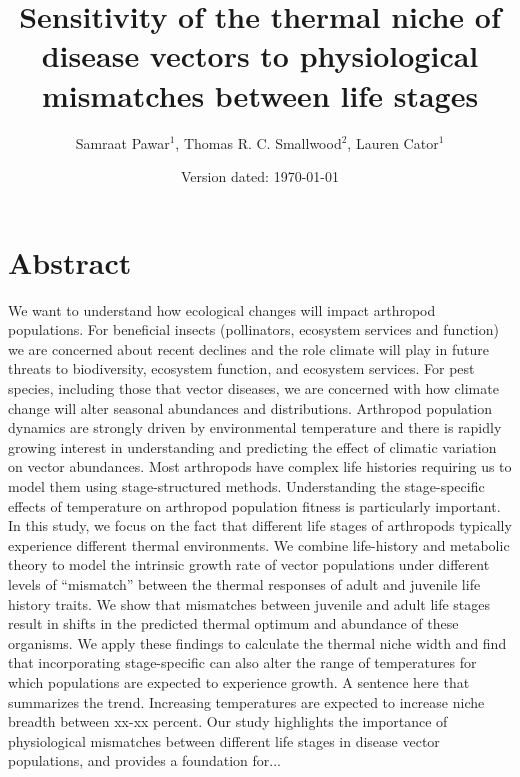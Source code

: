 

\title{Sensitivity of the thermal niche of disease vectors to physiological mismatches between life stages}

\author{Samraat Pawar$^1$, Thomas R. C. Smallwood$^2$, Lauren Cator$^1$}


\date{Version dated: \today}




\maketitle


\section*{Abstract}

We want to understand how ecological changes will impact arthropod populations. For beneficial insects (pollinators, ecosystem services and function) we are concerned about recent declines and the role climate will play in future threats to biodiversity, ecosystem function, and ecosystem services. For pest species, including those that vector diseases, we are concerned with how climate change will alter seasonal abundances and distributions.  Arthropod population dynamics are strongly driven by environmental temperature and there is rapidly growing interest in understanding and predicting the effect of climatic variation on vector abundances. Most arthropods have complex life histories requiring us to model them using stage-structured methods.  Understanding the stage-specific effects of temperature on arthropod population fitness is particularly important.  In this study, we focus on the fact that different life stages of arthropods typically experience different thermal environments. We combine life-history and metabolic theory to model the intrinsic growth rate of vector populations under different levels of ``mismatch'' between the thermal responses of adult and juvenile life history traits. We show that mismatches between juvenile and adult life stages result in shifts in the predicted thermal optimum and abundance of these organisms. We apply these findings to calculate the thermal niche width and find that incorporating stage-specific can also alter the range of temperatures for which populations are expected to experience growth. A sentence here that summarizes the trend. Increasing temperatures are expected to increase niche breadth between xx-xx percent. Our study highlights the importance of physiological mismatches between different life stages in disease vector populations, and provides a foundation for...

